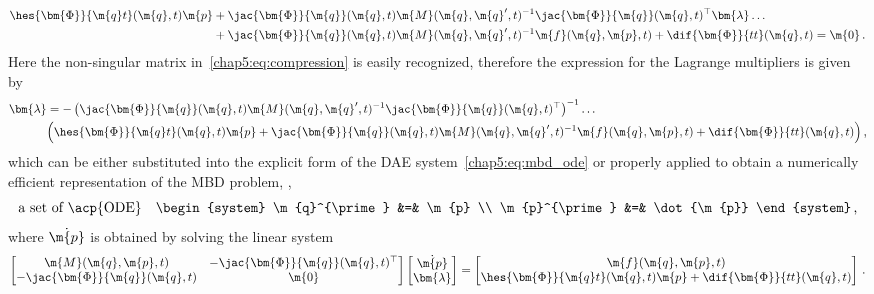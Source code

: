 %
\begin{align*}
  \hes{\bm{\Phi}}{\m{q}t}(\m{q}, t)\m{p} &+ \jac{\bm{\Phi}}{\m{q}}(\m{q}, t)\m{M}(\m{q}, \m{q}^{\prime}, t)^{-1} \jac{\bm{\Phi}}{\m{q}}(\m{q}, t)^{\top}\bm{\lambda} \dots \\
  &+ \jac{\bm{\Phi}}{\m{q}}(\m{q}, t)\m{M}(\m{q}, \m{q}^{\prime}, t)^{-1} \m{f}(\m{q},\m{p},t)+\dif{\bm{\Phi}}{tt}(\m{q}, t) = \m{0} \, \text{.}
\end{align*}
%
Here the non-singular matrix in~\eqref{chap5:eq:compression} is easily recognized, therefore the expression for the Lagrange multipliers is given by
%
\begin{align*}
  \bm{\lambda} &= -\left(\jac{\bm{\Phi}}{\m{q}}(\m{q}, t)\m{M}(\m{q}, \m{q}^{\prime}, t)^{-1} \jac{\bm{\Phi}}{\m{q}}(\m{q}, t)^{\top}\right)^{-1} \dots \\
  &\Big(\hes{\bm{\Phi}}{\m{q}t}(\m{q}, t)\m{p} + \jac{\bm{\Phi}}{\m{q}}(\m{q}, t)\m{M}(\m{q}, \m{q}^{\prime}, t)^{-1}\m{f}(\m{q},\m{p},t) + \dif{\bm{\Phi}}{tt}(\m{q}, t)\Big) \, \text{,}
\end{align*}
%
which can be either substituted into the explicit form of the \ac{DAE} system~\eqref{chap5:eq:mbd_ode} or properly applied to obtain a numerically efficient representation of the \ac{MBD} problem, \ie{},
%
\begin{equation*}
  \text{a set of \acp{ODE}} \quad
  \begin{system}
    \m{q}^{\prime} &=& \m{p} \\
    \m{p}^{\prime} &=& \dot{\m{p}}
  \end{system} \, \text{,} \\
\end{equation*}
%
where $\dot{\m{p}}$ is obtained by solving the linear system
%
\begin{equation*}
  \begin{bmatrix}
    \m{M}(\m{q}, \m{p}, t) & -\jac{\bm{\Phi}}{\m{q}}(\m{q}, t)^{\top} \\
    -\jac{\bm{\Phi}}{\m{q}}(\m{q}, t) & \m{0}
  \end{bmatrix}
  \begin{bmatrix}
    \dot{\m{p}} \\ \bm{\lambda}
  \end{bmatrix} = \begin{bmatrix}
    \m{f}(\m{q},\m{p},t) \\
    \hes{\bm{\Phi}}{\m{q}t}(\m{q}, t)\m{p} + \dif{\bm{\Phi}}{tt}(\m{q}, t)
  \end{bmatrix} \, \text{.}
\end{equation*}

